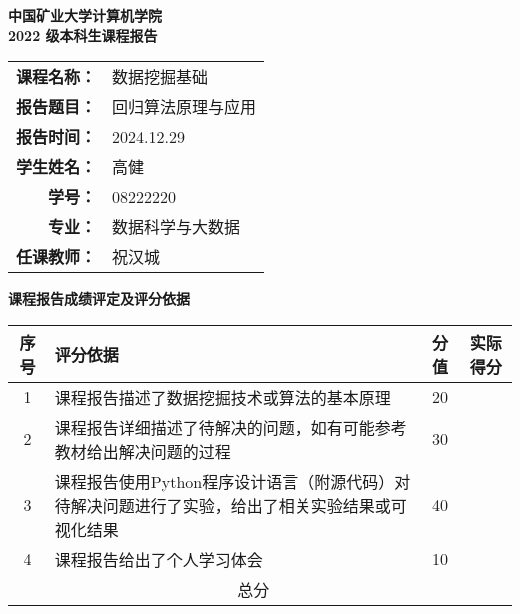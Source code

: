 \documentclass[a4paper, 12pt]{article}
\begin{document}
\thispagestyle{empty}
\begin{center}
    \textbf{\LARGE 中国矿业大学计算机学院} \\
    \vspace{0.8cm}
    \textbf{\Large 2022 级本科生课程报告}
\end{center}

\vspace{2cm}

\begin{center}
    \begin{tabular}{rl}
        \textbf{课程名称：} & 数据挖掘基础 \\[0.5cm]
        \textbf{报告题目：} & 回归算法原理与应用 \\[0.5cm]
        \textbf{报告时间：} & 2024.12.29 \\[0.5cm]
        \textbf{学生姓名：} & 高健 \\[0.5cm]
        \textbf{学号：} & 08222220 \\[0.5cm]
        \textbf{专业：} & 数据科学与大数据 \\[0.5cm]
        \textbf{任课教师：} & 祝汉城
    \end{tabular}
\end{center}

\newpage

\thispagestyle{empty}
\begin{center}
    \textbf{\Large 课程报告成绩评定及评分依据}
\end{center}

\vspace{1cm}

\begin{center}
    \begin{tabular}{|c|p{12cm}|c|c|}
        \hline
        \rule{0pt}{1.2cm}序号 & 评分依据 & 分值 & 实际得分 \\
        \hline
        \rule{0pt}{1.5cm}1 & 课程报告描述了数据挖掘技术或算法的基本原理 & 20 & \\
        \hline
        \rule{0pt}{1.5cm}2 & 课程报告详细描述了待解决的问题，如有可能参考教材给出解决问题的过程 & 30 & \\
        \hline
        \rule{0pt}{1.5cm}3 & 课程报告使用Python程序设计语言（附源代码）对待解决问题进行了实验，给出了相关实验结果或可视化结果 & 40 & \\
        \hline
        \rule{0pt}{1.5cm}4 & 课程报告给出了个人学习体会 & 10 & \\
        \hline
        \rule{0pt}{1.2cm} & \multicolumn{2}{|c|}{总分} & \\
        \hline
    \end{tabular}
\end{center}
\end{document}
